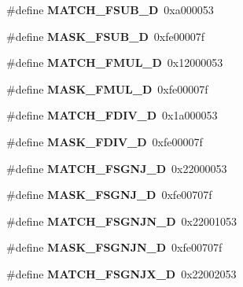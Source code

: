 \begin{DoxyCompactItemize}
\#define {\bfseries M\+A\+T\+C\+H\+\_\+\+F\+S\+U\+B\+\_\+D}~0xa000053
\item 
\mbox{\label{riscv-utility_8h_a04b6d92dcbdf8ffc4dc83487223cef8f}} 
\#define {\bfseries M\+A\+S\+K\+\_\+\+F\+S\+U\+B\+\_\+D}~0xfe00007f
\item 
\mbox{\label{riscv-utility_8h_a9ca26613725d01b6edf5179f6eeabc57}} 
\#define {\bfseries M\+A\+T\+C\+H\+\_\+\+F\+M\+U\+L\+\_\+D}~0x12000053
\item 
\mbox{\label{riscv-utility_8h_a0f9b5a2179871ff38c3c310d1d707094}} 
\#define {\bfseries M\+A\+S\+K\+\_\+\+F\+M\+U\+L\+\_\+D}~0xfe00007f
\item 
\mbox{\label{riscv-utility_8h_a28aec32a5fc748aee52698a02d9a289f}} 
\#define {\bfseries M\+A\+T\+C\+H\+\_\+\+F\+D\+I\+V\+\_\+D}~0x1a000053
\item 
\mbox{\label{riscv-utility_8h_afb35fed6770221de2fbe188fae896709}} 
\#define {\bfseries M\+A\+S\+K\+\_\+\+F\+D\+I\+V\+\_\+D}~0xfe00007f
\item 
\mbox{\label{riscv-utility_8h_ae31e5f231941325d2e291ca69d500bed}} 
\#define {\bfseries M\+A\+T\+C\+H\+\_\+\+F\+S\+G\+N\+J\+\_\+D}~0x22000053
\item 
\mbox{\label{riscv-utility_8h_a1e123c79b50e997364700f623183ea10}} 
\#define {\bfseries M\+A\+S\+K\+\_\+\+F\+S\+G\+N\+J\+\_\+D}~0xfe00707f
\item 
\mbox{\label{riscv-utility_8h_ad2e13a20cd06d91172a5a22c87733e3f}} 
\#define {\bfseries M\+A\+T\+C\+H\+\_\+\+F\+S\+G\+N\+J\+N\+\_\+D}~0x22001053
\item 
\mbox{\label{riscv-utility_8h_adc4d8baff06f401b9b6e00d188695d6b}} 
\#define {\bfseries M\+A\+S\+K\+\_\+\+F\+S\+G\+N\+J\+N\+\_\+D}~0xfe00707f
\item 
\mbox{\label{riscv-utility_8h_a3c043afa565abf1b51881f6762f39096}} 
\#define {\bfseries M\+A\+T\+C\+H\+\_\+\+F\+S\+G\+N\+J\+X\+\_\+D}~0x22002053
\item 

\end{DoxyCompactItemize}

